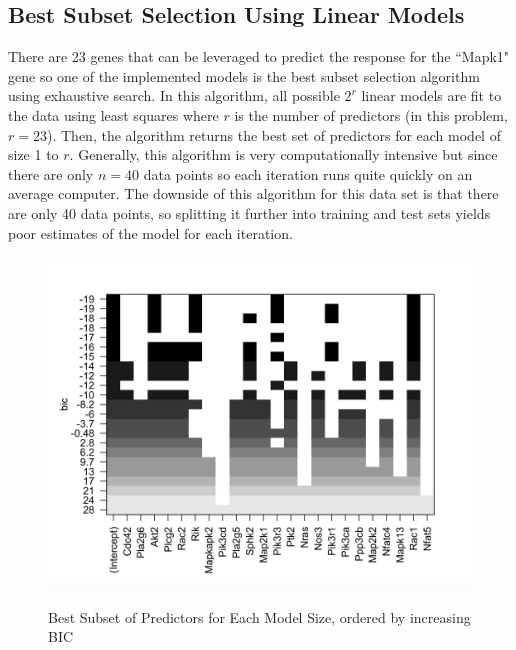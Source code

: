 \documentclass{article}
\begin{document}
\subsection{Best Subset Selection Using Linear Models}
There are 23 genes that can be leveraged to predict the response for the ``Mapk1" gene so one of the implemented models is the best subset selection algorithm using exhaustive search.  In this algorithm, all possible $2^r$ linear models are fit to the data using least squares where $r$ is the number of predictors (in this problem, $r=23$).  Then, the algorithm returns the best set of predictors for each model of size 1 to $r$.  Generally, this algorithm is very computationally intensive but since there are only $n=40$ data points so each iteration runs quite quickly on an average computer.  The downside of this algorithm for this data set is that there are only 40 data points, so splitting it further into training and test sets yields poor estimates of the model for each iteration. 
\begin{figure}[H]
	\caption{Best Subset of Predictors for Each Model Size, ordered by increasing BIC}
	\includegraphics[scale=0.60]{best_subsets}
	\centering
	\label{fig:best_subsets}
\end{figure}
\end{document}
